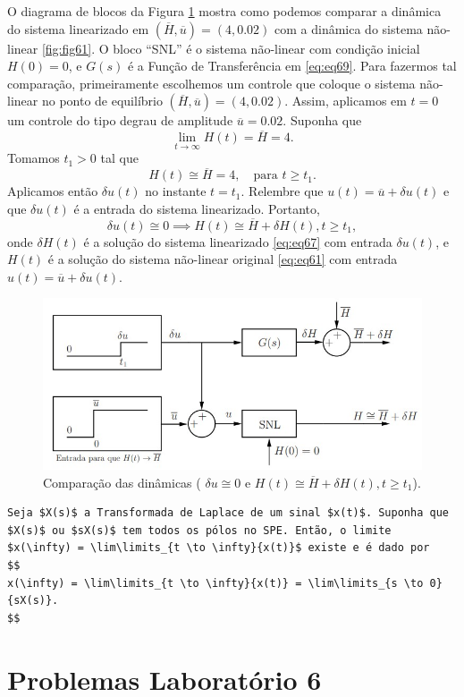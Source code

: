 \documentclass[
]{book}
\theoremstyle{definition}
\theoremstyle{definition}
\theoremstyle{definition}
\theoremstyle{remark}
\begin{document}
O diagrama de blocos da Figura \ref{fig:fig63} mostra como podemos comparar a dinâmica do sistema linearizado em \((\overline{H}, \overline{u}) = (4, 0.02)\) com a dinâmica do sistema não-linear \ref{fig:fig61}. O bloco ``SNL'' é o sistema não-linear com condição inicial \(H(0) = 0\), e \(G(s)\) é a Função de Transferência em \eqref{eq:eq69}. Para fazermos tal comparação, primeiramente escolhemos um controle que coloque o sistema não-linear no ponto de equilíbrio \((\overline{H}, \overline{u}) = (4, 0.02)\). Assim, aplicamos em \(t = 0\) um controle do tipo degrau de amplitude \(\overline{u} = 0.02\). Suponha que
\[
\lim\limits_{t\to\infty}{H(t)}  = \overline{H} =4.
\]
Tomamos \(t_1 > 0\) tal que
\[
H(t) \cong \overline{H} = 4, \quad \text{para } t\geq t_1. \label{eq:eq610}
\]
Aplicamos então \(\delta u(t)\) no instante \(t = t_1\). Relembre que \(u(t) = \overline{u} + \delta u(t)\) e que \(\delta u(t)\) é a entrada do sistema linearizado. Portanto,
\[
\boxed{\delta u(t) \cong 0 \implies H(t) \cong \overline{H} + \delta H(t), t \geq t_1},
\]
onde \(\delta H(t)\) é a solução do sistema linearizado \eqref{eq:eq67} com entrada \(\delta u(t)\), e \(H(t)\) é a solução do sistema não-linear original \eqref{eq:eq61} com entrada \(u(t) = \overline{u} + \delta u(t)\).

\begin{figure}

{\centering \includegraphics[width=0.5\linewidth]{Imagens/Lab6/Apresentação/fig3} 

}

\caption{Comparação das dinâmicas ( $\delta u \cong 0$ e $H(t) \cong \overline{H} + \delta H(t), t \geq t_1$).}\label{fig:fig63}
\end{figure}

\begin{verbatim}
Seja $X(s)$ a Transformada de Laplace de um sinal $x(t)$. Suponha que $X(s)$ ou $sX(s)$ tem todos os pólos no SPE. Então, o limite $x(\infty) = \lim\limits_{t \to \infty}{x(t)}$ existe e é dado por
$$
x(\infty) = \lim\limits_{t \to \infty}{x(t)} = \lim\limits_{s \to 0}{sX(s)}.
$$
\end{verbatim}

\hypertarget{problemas-laboratuxf3rio-6}{%
\chapter*{Problemas Laboratório 6}\label{problemas-laboratuxf3rio-6}}
\end{document}
